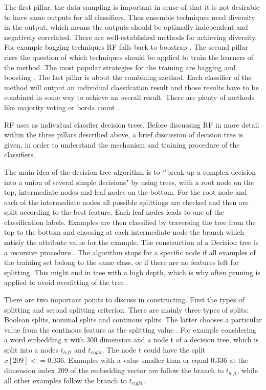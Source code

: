 \documentclass[12pt, a4paper, titlepage]{article}
\begin{document}
The first pillar, the data sampling is important in sense of that it is not desirable to have same outputs for all classifiers. Thus ensemble techniques need diversity in the output, which means the outputs should be optimally independent and negatively correlated. There are well-established methods for achieving diversity. For example bagging techniques \ac{RF} falls back to boostrap \citep{polikar2012}. The second pillar rises the question of which techniques should be applied to train the learners of the method. The most popular strategies for the training are bagging and boosting \citep{polikar2012}. The last pillar is about the combining method. Each classifier of the method will output an individual classifcation result and those results have to be combined in some way to achieve an overall result. There are plenty of methods like majority voting or borda count \citep{polikar2012}.

\ac{RF} uses as individual classfier decision trees. Before discussing \ac{RF} in more detail within the three pillars described above, a brief discussion of decision tree is given, in order to understand the mechanism and training procedure of the classifiers. 

The main idea of the decision tree algorithm is to `"break up a complex decision into a union of several simple decisions" \citep[660]{safavian1991} by using trees, with a root node on the top, intermediate nodes and leaf nodes on the bottom. For the root node and each of the intermediate nodes all possible splittings are checked and then are split according to the best feature. Each leaf nodes leads to one of the classification labels. Examples are then classified by traversing the tree from the top to the bottom and choosing at each intermediate node the branch which satisfy the attribute value for the example. The construction of a Decision tree is a recursive procedure \citep{Berthold2020, xia2008, cutler2012}. The algorithm stops for a specific node if all examples of the training set belong to the same class, or if there are no features left for splitting. This might end in tree with a high depth, which is why often pruning is applied to avoid overfitting of the tree \citet{Berthold2020}.

There are two important points to discuss in constructing. First the types of splitting and second splitting criterion. There are mainly three types of splits: Boolean splits, nominal splits and continous splits. The latter chooses a particular value from the continous feature as the splitting value \citep{cutler2012, Berthold2020}. For example considering a word embedding x with 300 dimension and a node t of a decision tree, which is split into a nodes $t_{left}$ and $t_{right}$. The node t could have the split $x[209] <= 0.336$. Examples with a value smaller than or equal $0.336$ at the dimension index $209$ of the embedding vector are follow the branch to $t_{left}$, while all other examples follow the branch to $t_{right}$.
\end{document}

